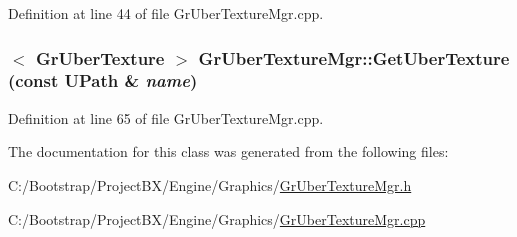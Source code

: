 Definition at line 44 of file GrUberTextureMgr.cpp.\hypertarget{class_gr_uber_texture_mgr_ecf501bff605e7027f3653ec97f261b6}{
\subsubsection[{GetUberTexture}]{$<$ {\bf GrUberTexture} $>$ GrUberTextureMgr::GetUberTexture (const {\bf UPath} \& {\em name})}}
\label{class_gr_uber_texture_mgr_ecf501bff605e7027f3653ec97f261b6}




Definition at line 65 of file GrUberTextureMgr.cpp.

The documentation for this class was generated from the following files:\begin{CompactItemize}
\item 
C:/Bootstrap/ProjectBX/Engine/Graphics/\hyperlink{_gr_uber_texture_mgr_8h}{GrUberTextureMgr.h}\item 
C:/Bootstrap/ProjectBX/Engine/Graphics/\hyperlink{_gr_uber_texture_mgr_8cpp}{GrUberTextureMgr.cpp}\end{CompactItemize}
